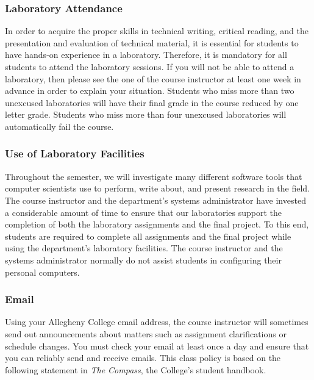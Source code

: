 \vspace{-.20in}
\subsubsection*{Laboratory Attendance}

In order to acquire the proper skills in technical writing, critical reading, and the presentation and evaluation of
technical material, it is essential for students to have hands-on experience in a laboratory. Therefore, it is mandatory
for all students to attend the laboratory sessions. If you will not be able to attend a laboratory, then please see the
one of the course instructor at least one week in advance in order to explain your situation. Students who miss more
than two unexcused laboratories will have their final grade in the course reduced by one letter grade.  Students who
miss more than four unexcused laboratories will automatically fail the course.

\vspace{-.1in}
\subsubsection*{Use of Laboratory Facilities}

Throughout the semester, we will investigate many different software tools that computer scientists use to perform,
write about, and present research in the field.  The course instructor and the department's systems administrator have
invested a considerable amount of time to ensure that our laboratories support the completion of both the laboratory
assignments and the final project.  To this end, students are required to complete all assignments and the final project
while using the department's laboratory facilities. The course instructor and the systems administrator normally do not
assist students in configuring their personal computers.

\vspace{-.10in}
\subsubsection*{Email}

Using your Allegheny College email address, the course instructor will sometimes send out announcements about matters
such as assignment clarifications or schedule changes. You must check your email at least once a day and ensure that
you can reliably send and receive emails. This class policy is based on the following statement in {\em The Compass},
the College's student handbook.

